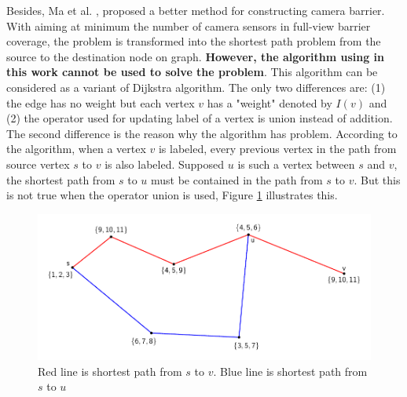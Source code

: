  Besides, Ma et al. \cite{ma2012minimum}, proposed a better method for constructing camera barrier. With aiming at minimum the number of camera sensors in full-view barrier coverage, the problem is transformed into the shortest path problem from the source to the destination node on graph. \textcolor{ProcessBlue}{\bfseries However, the algorithm using in this work cannot be used to solve the problem}. This algorithm can be considered as a variant of Dijkstra algorithm. The only two differences are: (1) the edge has no weight but each vertex $v$ has a "weight" denoted by $I(v)$ and (2) the operator used for updating label of a vertex is union instead of addition. The second difference is the reason why the algorithm has problem. According to the algorithm, when a vertex $v$ is labeled, every previous vertex in the path from source vertex $s$ to $v$ is also labeled. Supposed $u$ is such a vertex between $s$ and $v$, the shortest path from $s$ to $u$ must be contained in the path from $s$ to $v$. But this is not true when the operator union is used, Figure \ref{fig:01} illustrates this.
 
\begin{figure}[p]
	\centering
	\includegraphics[scale=0.6]{wrongDijstra.pdf}
	\caption{Red line is shortest path from $s$ to $v$. Blue line is shortest path from $s$ to $u$}
	\label{fig:01}
\end{figure}

